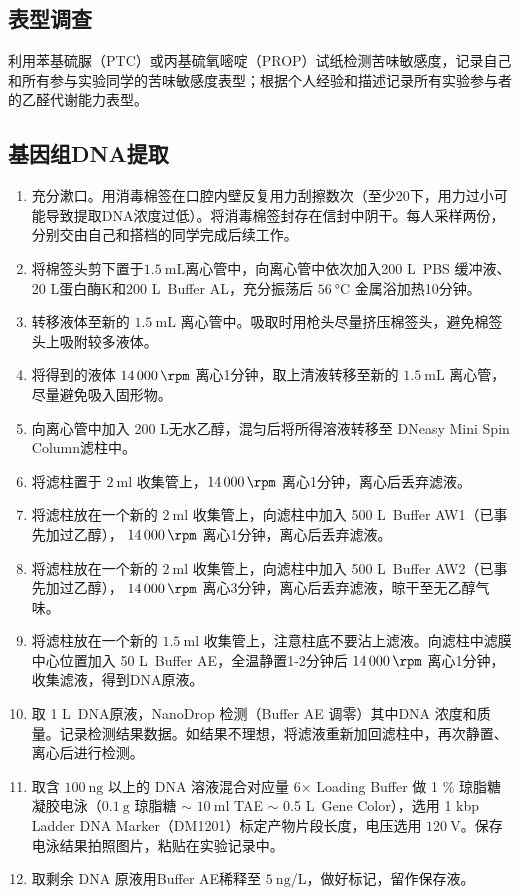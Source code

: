 \documentclass[10pt]{article}
\newcommand{\ul}{\textmu L}
\begin{document}
\subsection{表型调查}
利用苯基硫脲（PTC）或丙基硫氧嘧啶（PROP）试纸检测苦味敏感度，记录自己和所有参与实验同学的苦味敏感度表型；根据个人经验和描述记录所有实验参与者的乙醛代谢能力表型。

\subsection{基因组DNA提取}
\begin{enumerate}
    \item 充分漱口。用消毒棉签在口腔内壁反复用力刮擦数次（至少20下，用力过小可能导致提取DNA浓度过低）。将消毒棉签封存在信封中阴干。每人采样两份，分别交由自己和搭档的同学完成后续工作。
    \item 将棉签头剪下置于$\SI{1.5}{\mL}$离心管中，向离心管中依次加入200 \ul \ PBS 缓冲液、20 \ul 蛋白酶K和200 \ul \ Buffer AL，充分振荡后 $\SI{56}{\celsius}$ 金属浴加热10分钟。
    \item 转移液体至新的 $\SI{1.5}{\mL}$ 离心管中。吸取时用枪头尽量挤压棉签头，避免棉签头上吸附较多液体。
    \item 将得到的液体 $\SI{14000}{\rpm}$ 离心1分钟，取上清液转移至新的 $\SI{1.5}{\mL}$ 离心管，尽量避免吸入固形物。
    \item 向离心管中加入 200 \ul 无水乙醇，混匀后将所得溶液转移至 DNeasy Mini Spin Column滤柱中。
    \item 将滤柱置于 $\SI{2}{\ml}$ 收集管上，$\SI{14000}{\rpm}$ 离心1分钟，离心后丢弃滤液。
    \item 将滤柱放在一个新的 $\SI{2}{\ml}$ 收集管上，向滤柱中加入 500 \ul \ Buffer AW1（已事先加过乙醇）， $\SI{14000}{\rpm}$ 离心1分钟，离心后丢弃滤液。
    \item 将滤柱放在一个新的 $\SI{2}{\ml}$ 收集管上，向滤柱中加入 500 \ul \ Buffer AW2（已事先加过乙醇）， $\SI{14000}{\rpm}$ 离心3分钟，离心后丢弃滤液，晾干至无乙醇气味。
    \item 将滤柱放在一个新的 $\SI{1.5}{\ml}$ 收集管上，注意柱底不要沾上滤液。向滤柱中滤膜中心位置加入 50 \ul \ Buffer AE，全温静置1-2分钟后 $\SI{14000}{\rpm}$ 离心1分钟，收集滤液，得到DNA原液。
    \item 取 1 \ul \ DNA原液，NanoDrop 检测（Buffer AE 调零）其中DNA 浓度和质量。记录检测结果数据。如结果不理想，将滤液重新加回滤柱中，再次静置、离心后进行检测。
    \item 取含 $\SI{100}{\ng}$ 以上的 DNA 溶液混合对应量 6$\times$ Loading Buffer 做 1 \% 琼脂糖凝胶电泳（$\SI{0.1}{\g}$ 琼脂糖 $\sim$ $\SI{10}{\ml}$ TAE $\sim$ 0.5 \ul \  Gene Color），选用 1 kbp Ladder DNA Marker（DM1201）标定产物片段长度，电压选用 $\SI{120}{\V}$。保存电泳结果拍照图片，粘贴在实验记录中。
    \item 取剩余 DNA 原液用Buffer AE稀释至 $\SI{5}{\ng}$/\ul，做好标记，留作保存液。
\end{enumerate}
\end{document}
